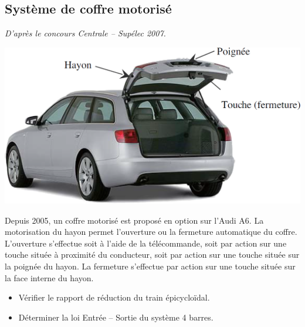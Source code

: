 \documentclass[10pt,fleqn]{article} %
\begin{document}
\begin{multicols}{2}
\section*{Système de coffre motorisé}
\setcounter{subparagraph}{0}
\begin{flushleft}
\textit{D'après le concours Centrale -- Supélec 2007.}
\end{flushleft}
\ifprof
\else

\begin{center}
\includegraphics[width=.7\linewidth]{images/A6_coffre}
\end{center}

Depuis 2005, un coffre motorisé est proposé en option sur l’Audi A6. La motorisation du hayon permet l’ouverture ou la fermeture automatique du coffre. L’ouverture s’effectue soit à l’aide de la télécommande, soit par action sur une touche située à proximité du conducteur, soit par action sur une touche située sur la poignée du hayon. La fermeture s’effectue par action sur une touche située sur la face interne du hayon.



\begin{obj}
\begin{itemize}
\item Vérifier le rapport de réduction du train épicycloïdal.
\item Déterminer la loi Entrée -- Sortie du système 4 barres.
\end{itemize}
\end{obj}


\end{multicols}
\end{document}

